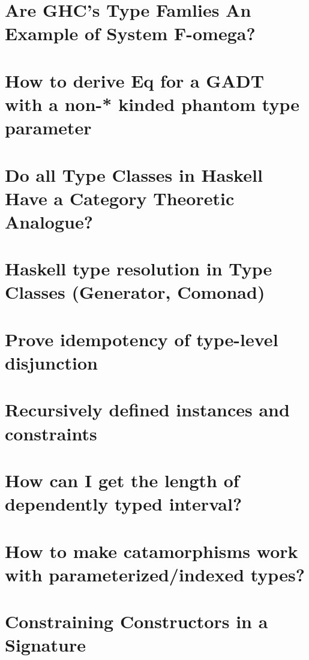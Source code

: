 \documentclass{book}
\begin{document}
\section{Are GHC's Type Famlies An Example of System F-omega?}


\section{How to derive Eq for a GADT with a non-* kinded phantom type parameter}


\section{Do all Type Classes in Haskell Have a Category Theoretic Analogue?}


\section{Haskell type resolution in Type Classes (Generator, Comonad)}


\section{Prove idempotency of type-level disjunction}


\section{Recursively defined instances and constraints}


\section{How can I get the length of dependently typed interval?}


\section{How to make catamorphisms work with parameterized/indexed types?}


\section{Constraining Constructors in a Signature}

\end{document}
